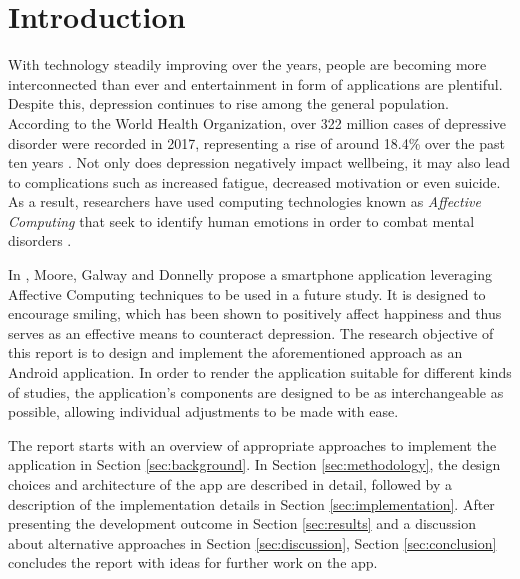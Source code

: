 \section{Introduction} \label{sec:introduction}
With technology steadily improving over the years, people are becoming more interconnected than ever and entertainment in form of applications are plentiful. Despite this, depression continues to rise among the general population.
According to the World Health Organization, over 322 million cases of depressive disorder were recorded in 2017, representing a rise of around 18.4\% over the past ten years \cite{who_depression}.
Not only does depression negatively impact wellbeing, it may also lead to complications such as increased fatigue, decreased motivation or even suicide.
As a result, researchers have used computing technologies known as \textit{Affective Computing} that seek to identify human emotions in order to combat mental disorders \cite{ieee_affective}.

In \cite{sohappy}, Moore, Galway and Donnelly propose a smartphone application leveraging Affective Computing techniques to be used in a future study.
It is designed to encourage smiling, which has been shown to positively affect happiness and thus serves as an effective means to counteract depression.
The research objective of this report is to design and implement the aforementioned approach as an Android application.
In order to render the application suitable for different kinds of studies, the application's components are designed to be as interchangeable as possible, allowing individual adjustments to be made with ease.

The report starts with an overview of appropriate approaches to implement the application in Section \ref{sec:background}.
In Section \ref{sec:methodology}, the design choices and architecture of the app are described in detail, followed by a description of the implementation details in Section \ref{sec:implementation}.
After presenting the development outcome in Section \ref{sec:results} and a discussion about alternative approaches in Section \ref{sec:discussion}, Section \ref{sec:conclusion} concludes the report with ideas for further work on the app.

